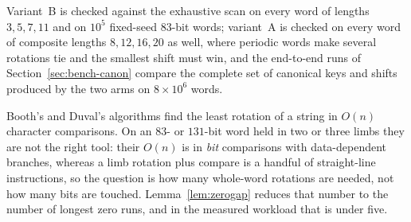 Variant~B is checked against the exhaustive scan on every word of
lengths $3,5,7,11$ and on $10^5$ fixed-seed $83$-bit words; variant~A
is checked on every word of composite lengths $8,12,16,20$ as well,
where periodic words make several rotations tie and the smallest shift
must win,
and the end-to-end runs of Section~\ref{sec:bench-canon} compare the
complete set of canonical keys and shifts produced by the two arms on
$8\times10^6$ words.

\begin{remark}
Booth's and Duval's algorithms find the least rotation of a string in
$O(n)$ character comparisons. On an $83$- or $131$-bit word held in two
or three limbs they are not the right tool: their $O(n)$ is in
\emph{bit} comparisons with data-dependent branches, whereas a limb
rotation plus compare is a handful of straight-line instructions, so
the question is how many whole-word rotations are needed, not how many
bits are touched. Lemma~\ref{lem:zerogap} reduces that number to the
number of longest zero runs, and in the measured workload that is
under five.
\end{remark}
